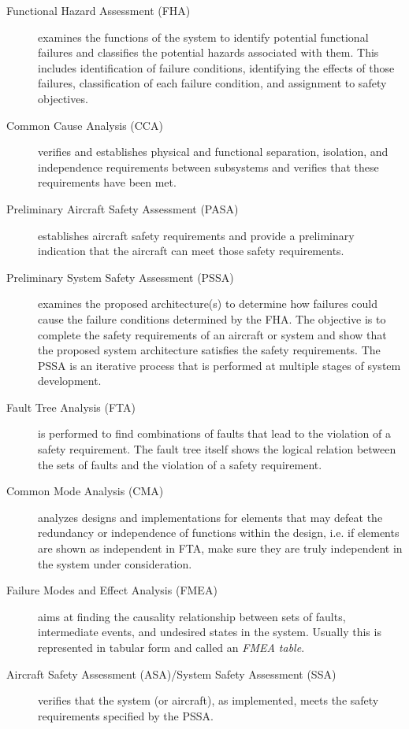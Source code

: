 \begin{description}
\item[Functional Hazard Assessment (FHA)] examines the functions of the system to identify potential functional failures and classifies the potential hazards associated with them. This includes identification of failure conditions, identifying the effects of those failures, classification of each failure condition, and assignment to safety objectives.

\item[Common Cause Analysis (CCA)] verifies and establishes physical and functional separation, isolation, and independence requirements between subsystems and verifies that these requirements have been met.

\item[Preliminary Aircraft Safety Assessment (PASA)] establishes aircraft safety requirements and provide a preliminary indication that the aircraft can meet those safety requirements.

\item[Preliminary System Safety Assessment (PSSA)] examines the proposed architecture(s) to determine how failures could cause the failure conditions determined by the FHA. The objective is to complete the safety requirements of an aircraft or system and show that the proposed system architecture satisfies the safety requirements. The PSSA is an iterative process that is performed at multiple stages of system development. 

\item[Fault Tree Analysis (FTA)] is performed to find combinations of faults that lead to the violation of a safety requirement. The fault tree itself shows the logical relation between the sets of faults and the violation of a safety requirement.

\item[Common Mode Analysis (CMA)] analyzes designs and implementations for elements that may defeat the redundancy
or independence of functions within the design, i.e. if elements are shown as independent in FTA, make sure they are truly independent in the system under consideration.

\item[Failure Modes and Effect Analysis (FMEA)] aims at finding the causality relationship between sets of faults, intermediate events, and undesired states in the system. Usually this is represented in tabular form and called an \textit{FMEA table}.

\item[Aircraft Safety Assessment (ASA)/System Safety Assessment (SSA)] verifies that the system (or aircraft), as implemented, meets the safety requirements specified by the PSSA.

\end{description}

